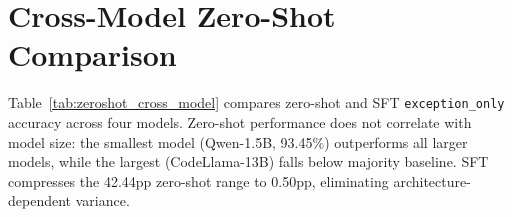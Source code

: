 \section{Cross-Model Zero-Shot Comparison}
\label{sec:zeroshot_cross_model}

Table~\ref{tab:zeroshot_cross_model} compares zero-shot and SFT \texttt{exception\_only} accuracy across four models.
Zero-shot performance does not correlate with model size: the smallest model (Qwen-1.5B, 93.45\%) outperforms all larger models, while the largest (CodeLlama-13B) falls below majority baseline.
SFT compresses the 42.44pp zero-shot range to 0.50pp, eliminating architecture-dependent variance.

\begin{table}[t]
\centering
\caption{Zero-shot vs.\ SFT \texttt{exception\_only} across four models ($N{=}1{,}190$). Zero-shot accuracy is uncorrelated with model size; SFT normalizes cross-architecture variance from 42.44pp to 0.50pp.}
\label{tab:zeroshot_cross_model}
\small
{}
\end{table}
